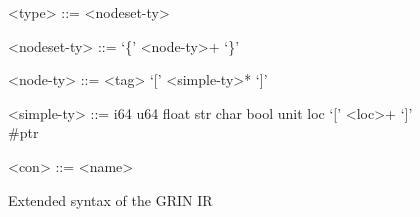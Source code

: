 \documentclass[main.tex]{subfiles}
\begin{document}
\begin{figure}[h]
\begin{minipage}{0.45\textwidth}
\begin{grammar}
				<type> ::= <nodeset-ty>
				\alt <simple-ty>
				
				<nodeset-ty> ::= `\{' <node-ty>+ `\}'
				
				<node-ty> ::= <tag> {`['} <simple-ty>* {`]'}
		
				<simple-ty> ::= i64
				\alt u64
				\alt float
				\alt str
				\alt char
				\alt bool
				\alt unit
				\alt loc `[' <loc>+ `]'
				\alt \#ptr
				
				<con> ::= <name>
			\end{grammar}
		\end{minipage}
	\caption{Extended syntax of the GRIN IR}
	\label{fig:syntax-new}
	\end{figure}
	
\end{document}
